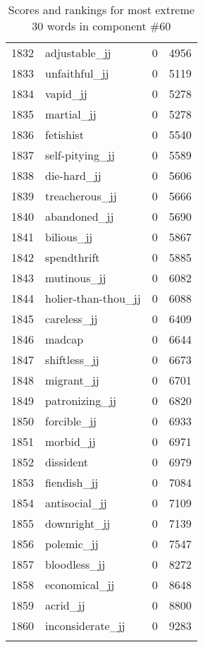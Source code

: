 \begin{longtable}[!htbp]{| rlr@{.}l |}
    1832 & adjustable\_jj & 0 & 4956 \\
    1833 & unfaithful\_jj & 0 & 5119 \\
    1834 & vapid\_jj & 0 & 5278 \\
    1835 & martial\_jj & 0 & 5278 \\
    1836 & fetishist & 0 & 5540 \\
    1837 & self-pitying\_jj & 0 & 5589 \\
    1838 & die-hard\_jj & 0 & 5606 \\
    1839 & treacherous\_jj & 0 & 5666 \\
    1840 & abandoned\_jj & 0 & 5690 \\
    1841 & bilious\_jj & 0 & 5867 \\
    1842 & spendthrift & 0 & 5885 \\
    1843 & mutinous\_jj & 0 & 6082 \\
    1844 & holier-than-thou\_jj & 0 & 6088 \\
    1845 & careless\_jj & 0 & 6409 \\
    1846 & madcap & 0 & 6644 \\
    1847 & shiftless\_jj & 0 & 6673 \\
    1848 & migrant\_jj & 0 & 6701 \\
    1849 & patronizing\_jj & 0 & 6820 \\
    1850 & forcible\_jj & 0 & 6933 \\
    1851 & morbid\_jj & 0 & 6971 \\
    1852 & dissident & 0 & 6979 \\
    1853 & fiendish\_jj & 0 & 7084 \\
    1854 & antisocial\_jj & 0 & 7109 \\
    1855 & downright\_jj & 0 & 7139 \\
    1856 & polemic\_jj & 0 & 7547 \\
    1857 & bloodless\_jj & 0 & 8272 \\
    1858 & economical\_jj & 0 & 8648 \\
    1859 & acrid\_jj & 0 & 8800 \\
    1860 & inconsiderate\_jj & 0 & 9283 \\
    \hline
    \caption{Scores and rankings for most extreme 30 words in component \#60} \\
\end{longtable}
